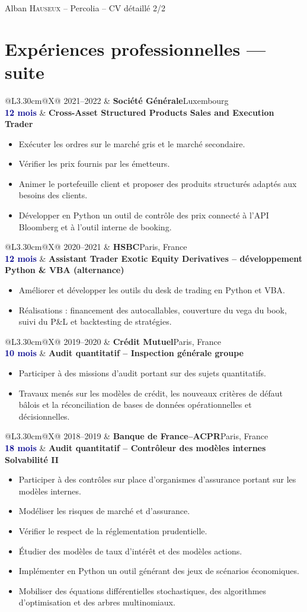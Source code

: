 \documentclass[10pt,a4paper]{article}
\makeatletter
\newcommand{\cventry}[5]{%
  \begin{tabularx}{\textwidth}{@{}L{3.30cm}@{\hspace{0.22cm}}X@{}}
    \textcolor{softgray}{#1} & \textbf{#3}\hfill\textcolor{softgray}{#4}\\[-0.10ex]
    \small\textcolor{darkblue}{\textbf{#2}} & \textbf{#5}
  \end{tabularx}\vspace{-0.22em}
}
\makeatother
\begin{document}
\begin{center}
  {\small\color{softgray}Alban \textsc{Hauseux} -- Percolia -- CV détaillé \textbullet{} 2/2}
\end{center}
\vspace{-0.75em}

\section*{Expériences professionnelles — suite}
\cventry{2021--2022}{12 mois}{Société Générale}{Luxembourg}{Cross-Asset Structured Products Sales and Execution Trader}
\begin{itemize}
  \item Exécuter les ordres sur le marché gris et le marché secondaire.
  \item Vérifier les prix fournis par les émetteurs.
  \item Animer le portefeuille client et proposer des produits structurés adaptés aux
  besoins des clients.
  \item Développer en Python un outil de contrôle des prix connecté à l'API Bloomberg et à
  l'outil interne de booking.
\end{itemize}
\cventry{2020--2021}{12 mois}{HSBC}{Paris, France}{Assistant Trader Exotic Equity Derivatives -- développement Python \& VBA (alternance)}
\begin{itemize}
  \item Améliorer et développer les outils du desk de trading en Python et VBA.
  \item Réalisations : financement des autocallables, couverture du vega du book, suivi du
  P\&L et backtesting de stratégies.
\end{itemize}
\cventry{2019--2020}{10 mois}{Crédit Mutuel}{Paris, France}{Audit quantitatif -- Inspection générale groupe}
\begin{itemize}
  \item Participer à des missions d'audit portant sur des sujets quantitatifs.
  \item Travaux menés sur les modèles de crédit, les nouveaux critères de défaut bâlois et
  la réconciliation de bases de données opérationnelles et décisionnelles.
\end{itemize}
\cventry{2018--2019}{18 mois}{Banque de France--ACPR}{Paris, France}{Audit quantitatif -- Contrôleur des modèles internes Solvabilité II}
\begin{itemize}
  \item Participer à des contrôles sur place d'organismes d'assurance portant sur les
  modèles internes.
  \item Modéliser les risques de marché et d'assurance.
  \item Vérifier le respect de la réglementation prudentielle.
  \item Étudier des modèles de taux d'intérêt et des modèles actions.
  \item Implémenter en Python un outil générant des jeux de scénarios économiques.
  \item Mobiliser des équations différentielles stochastiques, des algorithmes
  d'optimisation et des arbres multinomiaux.
\end{itemize}
\end{document}

